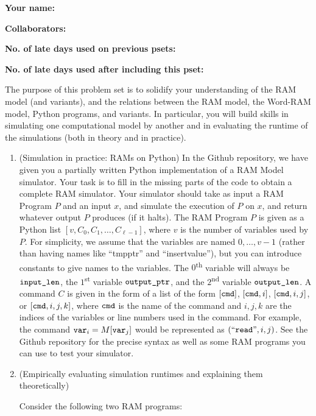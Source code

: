 \documentclass[11pt]{article}
\begin{document}

\textbf{Your name: }

\textbf{Collaborators: }

\textbf{No. of late days used on previous psets: }

\textbf{No. of late days used after including this pset: }


The purpose of this problem set is to solidify your understanding of the RAM model (and variants), and the relations between the RAM model, the Word-RAM model, Python programs, and variants. In particular, you will build skills in simulating one computational model by another and in evaluating the runtime of the simulations (both in theory and in practice).



\begin{enumerate}
 
    \item (Simulation in practice: RAMs on Python)  
    In the Github repository, we have given you a partially written Python implementation of a RAM Model simulator.  Your task is to fill in the missing parts of the code to obtain a complete RAM simulator.
     Your simulator should take as input a RAM Program $P$ and an input $x$, and simulate the execution of $P$ on $x$, and return whatever output $P$ produces (if it halts).  The RAM Program $P$ is given as a Python list $[v,C_0,C_1,\ldots,C_{\ell-1}]$, where $v$ is the number of variables used by $P$.  For simplicity, we assume that the variables are named $0,\ldots,v-1$ (rather than having names like ``tmpptr'' and ``insertvalue''), but you can introduce constants to give names to the variables.  The $0$\textsuperscript{th} variable will always be $\texttt{input\_len}$, the $1$\textsuperscript{st} variable $\texttt{output\_ptr}$, and the $2$\textsuperscript{nd} variable $\texttt{output\_len}$.  A command $C$ is given in the form of a list of the form $[\texttt{cmd}]$, $[\texttt{cmd},i]$, $[\texttt{cmd},i,j]$, or $[\texttt{cmd},i,j,k]$, where $\texttt{cmd}$ is the name of the command and $i,j,k$ are the indices of the variables or line numbers used in the command.  For example,  the command $\texttt{var}_i = M[\texttt{var}_j]$ would be represented as $(``\texttt{read}",i,j)$.  See the Github repository for the precise syntax as well as some RAM programs you can use to test your simulator.

    \item (Empirically evaluating simulation runtimes and explaining them theoretically)  

Consider the following two RAM programs:


\end{enumerate}
\end{document}
